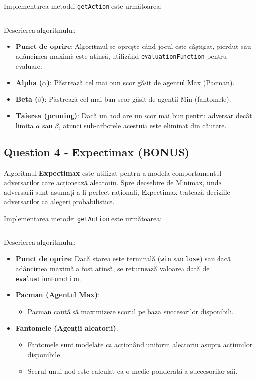 \par Implementarea metodei \texttt{getAction} este următoarea:
\inputminted[linenos]{python}{code/alpha_beta_pruning.py}

\par Descrierea algoritmului:
\begin{itemize}
	\item \textbf{Punct de oprire}: Algoritmul se oprește când jocul este câștigat, pierdut sau adâncimea maximă este atinsă, utilizând \texttt{evaluationFunction} pentru evaluare.
	\item \textbf{Alpha (\( \alpha \))}: Păstrează cel mai bun scor găsit de agentul Max (Pacman).
	\item \textbf{Beta (\( \beta \))}: Păstrează cel mai bun scor găsit de agenții Min (fantomele).
	\item \textbf{Tăierea (pruning)}: Dacă un nod are un scor mai bun pentru adversar decât limita \( \alpha \) sau \( \beta \), atunci sub-arborele acestuia este eliminat din căutare.
\end{itemize}

\subsection{Question 4 - Expectimax (BONUS)}
\par Algoritmul \textbf{Expectimax} este utilizat pentru a modela comportamentul adversarilor care acționează aleatoriu. Spre deosebire de Minimax, unde adversarii sunt asumați a fi perfect raționali, Expectimax tratează deciziile adversarilor ca alegeri probabilistice.

\par Implementarea metodei \texttt{getAction} este următoarea:
\inputminted[linenos]{python}{code/expectimax.py}

\par Descrierea algoritmului:
\begin{itemize}
    \item \textbf{Punct de oprire}: Dacă starea este terminală (\texttt{win} sau \texttt{lose}) sau dacă adâncimea maximă a fost atinsă, se returnează valoarea dată de \texttt{evaluationFunction}.
    \item \textbf{Pacman (Agentul Max)}:
    \begin{itemize}
        \item Pacman caută să maximizeze scorul pe baza succesorilor disponibili.
    \end{itemize}
    \item \textbf{Fantomele (Agenții aleatorii)}:
    \begin{itemize}
        \item Fantomele sunt modelate ca acționând uniform aleatoriu asupra acțiunilor disponibile.
        \item Scorul unui nod este calculat ca o medie ponderată a succesorilor săi.
    \end{itemize}
\end{itemize}

